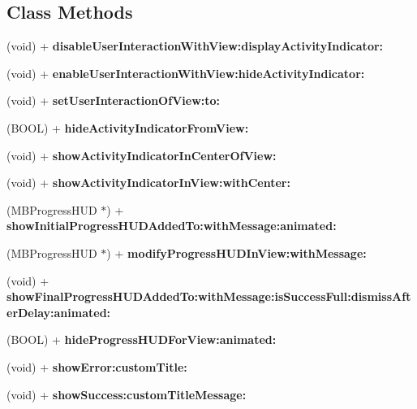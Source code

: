 \subsection*{Class Methods}
\begin{DoxyCompactItemize}
\item 
(void) + {\bfseries disable\+User\+Interaction\+With\+View\+:display\+Activity\+Indicator\+:}\label{interface_alert_user_a672bf4033931d153b219f6fc8a355938}

\item 
(void) + {\bfseries enable\+User\+Interaction\+With\+View\+:hide\+Activity\+Indicator\+:}\label{interface_alert_user_a83794e76ebd691fa0e4735bd6b8d333f}

\item 
(void) + {\bfseries set\+User\+Interaction\+Of\+View\+:to\+:}\label{interface_alert_user_a647f929366643827300652e92cdef2e2}

\item 
(B\+O\+O\+L) + {\bfseries hide\+Activity\+Indicator\+From\+View\+:}\label{interface_alert_user_a19ace99d7817e8fe70031c401de27343}

\item 
(void) + {\bfseries show\+Activity\+Indicator\+In\+Center\+Of\+View\+:}\label{interface_alert_user_abdeb40002fc1209bbad0509bde005880}

\item 
(void) + {\bfseries show\+Activity\+Indicator\+In\+View\+:with\+Center\+:}\label{interface_alert_user_a48344f67f9176d0b5266e893bc0612ba}

\item 
(M\+B\+Progress\+H\+U\+D $\ast$) + {\bfseries show\+Initial\+Progress\+H\+U\+D\+Added\+To\+:with\+Message\+:animated\+:}\label{interface_alert_user_a2bb52a548e7249b91c21d15b796d9178}

\item 
(M\+B\+Progress\+H\+U\+D $\ast$) + {\bfseries modify\+Progress\+H\+U\+D\+In\+View\+:with\+Message\+:}\label{interface_alert_user_a62908bafabbd188915a2fd29cc126021}

\item 
(void) + {\bfseries show\+Final\+Progress\+H\+U\+D\+Added\+To\+:with\+Message\+:is\+Success\+Full\+:dismiss\+After\+Delay\+:animated\+:}\label{interface_alert_user_ae04dce948699033203c07da1e3e65ce5}

\item 
(B\+O\+O\+L) + {\bfseries hide\+Progress\+H\+U\+D\+For\+View\+:animated\+:}\label{interface_alert_user_a2afbed98f8b6cb516b386437df377d27}

\item 
(void) + {\bfseries show\+Error\+:custom\+Title\+:}\label{interface_alert_user_afbeca143e26b919d8cee90895a948499}

\item 
(void) + {\bfseries show\+Success\+:custom\+Title\+Message\+:}\label{interface_alert_user_a2b7715cecb9c4b413fa4b7c95e8c4679}

\end{DoxyCompactItemize}


